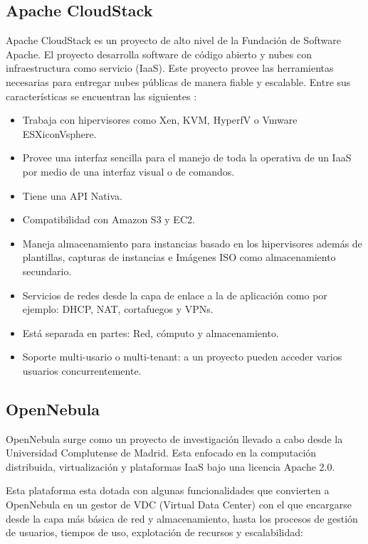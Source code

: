 \subsection{Apache CloudStack}
Apache CloudStack es un proyecto de alto nivel de la Fundación de Software
Apache. El proyecto desarrolla software de código abierto y nubes con infraestructura
como servicio (IaaS).
Este proyecto provee las herramientas necesarias para entregar nubes públicas de
manera fiable y escalable.
Entre sus características se encuentran las siguientes \cite{noauthor_apache_nodate}:

\begin{itemize}
\item Trabaja con hipervisores como Xen, KVM, HyperfV o Vmware ESXiconVsphere.
\item Provee una interfaz sencilla para el manejo de toda la operativa de un
IaaS por medio de  una interfaz visual o de comandos.
\item Tiene una API Nativa.
\item Compatibilidad con Amazon S3 y EC2.
\item Maneja almacenamiento para instancias basado en los hipervisores
además de plantillas, capturas de instancias e Imágenes ISO como
almacenamiento secundario.
\item Servicios de redes desde la capa de enlace a la de aplicación como por ejemplo: DHCP, NAT, cortafuegos y VPNs.
\item Está separada en partes: Red, cómputo y almacenamiento.
\item Soporte multi-usario o multi-tenant: a un proyecto pueden acceder varios usuarios concurrentemente.
\end{itemize}

\subsection{OpenNebula}
OpenNebula surge como un proyecto de investigación llevado a cabo desde la Universidad Complutense de Madrid. Esta enfocado en la computación distribuida, virtualización y plataformas IaaS bajo una licencia Apache 2.0.\cite{noauthor_about_nodate}

Esta plataforma esta dotada con algunas funcionalidades que convierten a OpenNebula en un gestor de VDC (Virtual Data Center) con el que encargarse desde la capa más básica de red y almacenamiento, hasta los procesos de gestión de usuarios, tiempos de uso, explotación de recursos y escalabilidad:

